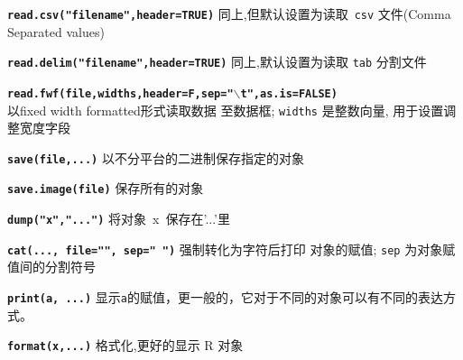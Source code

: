 \documentclass[landscape]{article}
\newcommand{\code}{\texttt}
\newcommand{\bcode}[1]{\texttt{\textbf{#1}}}
\begin{document}
\begin{multicols*}{3}
\bcode{read.csv("filename",header=TRUE)} 同上,但默认设置为读取~\code{csv} 文件(Comma Separated values)

\bcode{read.delim("filename",header=TRUE)} 同上,默认设置为读取 \code{tab} 分割文件


\bcode{read.fwf(file,widths,header=F,sep="$\backslash$t",as.is=FALSE)}   \\
以fixed width formatted形式读取数据
至数据框; \code{widths} 是整数向量, 用于设置调整宽度字段

\bcode{save(file,...)} 以不分平台的二进制保存指定的对象

\bcode{save.image(file)} 保存所有的对象


\bcode{dump("x","...")}    将对象~x~保存在'...'里

\bcode{cat(..., file="", sep=" ")} 强制转化为字符后打印 对象的赋值;
                                     \code{sep} 为对象赋值间的分割符号

\bcode{print(a, ...)} 显示\code{a}的赋值，更一般的，它对于不同的对象可以有不同的表达方式。

\bcode{format(x,...)} 格式化,更好的显示 R 对象



\end{multicols*}
\end{document}
